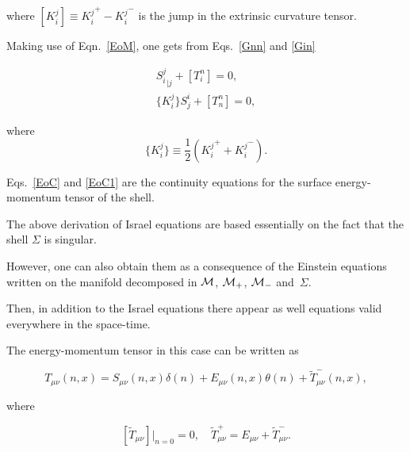 where  $[K_i^j] \equiv {K_i^j}^+ - {K_i^j}^-$ is the jump in the extrinsic curvature tensor.



Making use of Eqn.~\eqref{EoM}, one gets from Eqs.~\eqref{Gnn} and \eqref{Gin}

\begin{gather}

\label{EoC}

{S_i^j}_{|j}+[T_i^n]=0,

\\

\label{EoC1}

\{K_i^j\}S_j^i+[T_n^n]=0,

\end{gather}

where $$\{K_i^j\} \equiv \frac{1}{2}({K_i^j}^+ + {K_i^j}^-).$$ 

Eqs.~\eqref{EoC} and \eqref{EoC1} are the continuity equations for the surface energy-momentum tensor of the shell.



The above derivation of Israel equations are based essentially on the fact that the shell $\Sigma$ is singular. 

However, one can also obtain them as a consequence of the Einstein equations written on the manifold decomposed in ${\cal M}$, ${\cal M}_+$, ${\cal M}_-$ and~$\Sigma$. 

Then, in addition to the Israel equations there appear as well equations valid everywhere in the space-time. 

The energy-momentum tensor in this case can be written as

\begin{equation}

\label{tmn_gen}

T_{\mu\nu}(n,x)=S_{\mu\nu}(n,x)\delta(n)+ E_{\mu\nu}(n,x)\theta(n)+\tilde T^-_{\mu\nu}(n,x),

\end{equation}

where

\begin{equation}


[\tilde T_{\mu\nu}]|_{n=0} = 0, \quad 

\tilde T^+_{\mu\nu} = E_{\mu\nu}+ \tilde T^-_{\mu\nu}.

\end{equation}

